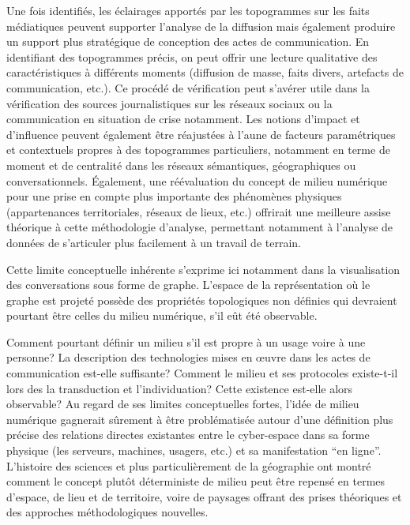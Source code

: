 Une fois identifiés, les éclairages apportés par les topogrammes sur les faits médiatiques peuvent supporter l{\textquoteright}analyse de la diffusion mais également produire un support plus stratégique de conception des actes de communication. En identifiant des topogrammes précis, on peut offrir une lecture qualitative des caractéristiques à différents moments (diffusion de masse, faits divers, artefacts de communication, etc.). Ce procédé de vérification peut s{\textquoteright}avérer utile dans la vérification des sources journalistiques sur les réseaux sociaux ou la communication en situation de crise notamment. Les notions d{\textquoteright}impact et d{\textquoteright}influence peuvent également être réajustées à l{\textquoteright}aune de facteurs paramétriques et contextuels propres à des topogrammes particuliers, notamment en terme de moment et de centralité dans les réseaux sémantiques, géographiques ou conversationnels. Également, une réévaluation du concept de milieu numérique pour une prise en compte plus importante des phénomènes physiques (appartenances territoriales, réseaux de lieux, etc.) offrirait une meilleure assise théorique à cette méthodologie d{\textquoteright}analyse, permettant notamment à l{\textquoteright}analyse de données de s'articuler plus facilement à un travail de terrain. 

Cette limite conceptuelle inhérente s{\textquoteright}exprime ici notamment dans la visualisation des conversations sous forme de graphe. L'espace de la représentation où le graphe est projeté possède des propriétés topologiques non définies qui devraient pourtant être celles du milieu numérique, s'il eût été observable. 

Comment pourtant définir un milieu s{\textquoteright}il est propre à un usage voire à une personne? La description des technologies mises en {\oe}uvre dans les actes de communication est-elle suffisante? Comment le milieu et ses protocoles existe-t-il lors des la transduction et l{\textquoteright}individuation? Cette existence est-elle alors observable? Au regard de ses limites conceptuelles fortes, l{\textquoteright}idée de milieu numérique gagnerait s\^urement à être problématisée autour d{\textquoteright}une définition plus précise des relations directes existantes entre le cyber-espace dans sa forme physique (les serveurs, machines, usagers, etc.) et sa manifestation {\textquotedblleft}en ligne{\textquotedblright}. L{\textquoteright}histoire des sciences et plus particulièrement de la géographie ont montré comment le concept plut\^ot déterministe de milieu peut être repensé en termes d{\textquoteright}espace, de lieu et de territoire, voire de paysages offrant des prises théoriques et des approches méthodologiques nouvelles. 

